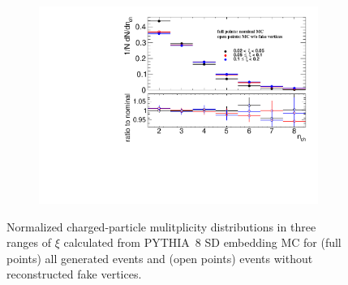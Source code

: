\begin{figure}[h!]
	\centering
	\begin{subfigure}{.47\textwidth}
		\includegraphics[width=\textwidth,page=1]{chapters/chrgSTAR/img/vertex/nchFake.pdf}
	\end{subfigure}
	\begin{minipage}{.47\textwidth}
		\caption{Normalized charged-particle mulitplicity distributions in three ranges of $\xi$ calculated from PYTHIA~8 SD embedding  MC for (full points) all generated events and (open points) events without reconstructed fake vertices.}
		\label{fig:nchVertex}
	\end{minipage}
	\vspace{-0.5cm}
\end{figure}

